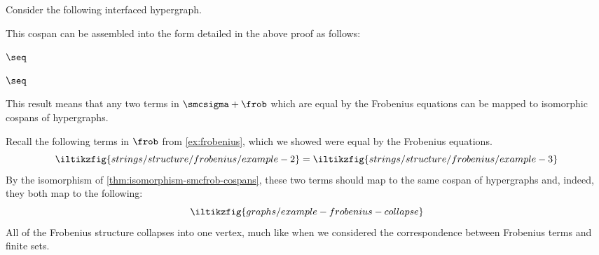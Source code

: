 \begin{example}
    Consider the following interfaced hypergraph.
    \begin{center}
    \end{center}
    This cospan can be assembled into the form detailed in the above proof as
    follows:
    \begin{center}
        \(\seq\)
        \(\seq\)
    \end{center}
\end{example}

This result means that any two terms in \(\smcsigma + \frob\) which are equal by
the Frobenius equations can be mapped to isomorphic cospans of hypergraphs.

\begin{example}
    Recall the following terms in \(\frob\) from \cref{ex:frobenius}, which
    we showed were equal by the Frobenius equations.
    \[
        \iltikzfig{strings/structure/frobenius/example-2}
        =
        \iltikzfig{strings/structure/frobenius/example-3}
    \]
    By the isomorphism of \cref{thm:isomorphism-smcfrob-cospans}, these two
    terms should map to the same cospan of hypergraphs and, indeed, they both
    map to the following:
    \[
        \iltikzfig{graphs/example-frobenius-collapse}
    \]
    All of the Frobenius structure collapses into one vertex, much like when we
    considered the correspondence between Frobenius terms and finite sets.
\end{example}

